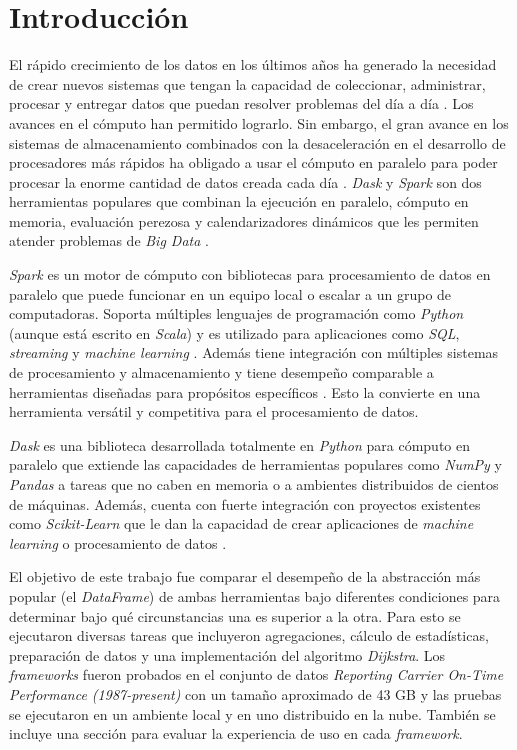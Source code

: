 \chapter*{Introducción}


\noindent El rápido crecimiento de los datos en los últimos años ha generado la necesidad de crear nuevos sistemas que tengan la capacidad de coleccionar, administrar, procesar y entregar datos que puedan resolver problemas del día a día \cite{seagate}. Los avances en el cómputo han permitido lograrlo. Sin embargo, el gran avance en los sistemas de almacenamiento combinados con la desaceleración en el desarrollo de procesadores más rápidos ha obligado a usar el cómputo en paralelo para poder procesar la enorme cantidad de datos creada cada día \cite{sparkguide}. \textit{Dask} y \textit{Spark} son dos herramientas populares que combinan la ejecución en paralelo, cómputo en memoria, evaluación perezosa y calendarizadores dinámicos que les permiten atender problemas de \textit{Big Data} \cite{dask-spark-neuroimaging}.

\textit{Spark} es un motor de cómputo con bibliotecas para procesamiento de datos en paralelo que puede funcionar en un equipo local o escalar a un grupo de computadoras. Soporta múltiples lenguajes de programación como \textit{Python} (aunque está escrito en \textit{Scala}) y es utilizado para aplicaciones como \textit{SQL}, \textit{streaming} y \textit{machine learning} \cite{sparkguide}. Además tiene integración con múltiples sistemas de procesamiento y almacenamiento y tiene desempeño comparable a herramientas diseñadas para propósitos específicos \cite{sparkberkeley}. Esto la convierte en una herramienta versátil y competitiva para el procesamiento de datos. 

\textit{Dask} es una biblioteca desarrollada totalmente en \textit{Python} para cómputo en paralelo que extiende las capacidades de herramientas populares como \textit{NumPy} y \textit{Pandas} a tareas que no caben en memoria o a ambientes distribuidos de cientos de máquinas. Además, cuenta con fuerte integración con proyectos existentes como \textit{Scikit-Learn} que le dan la capacidad de crear aplicaciones de \textit{machine learning} o procesamiento de datos \cite{daskdocs}.

El objetivo de este trabajo fue comparar el desempeño de la abstracción más popular (el \textit{DataFrame}) de ambas herramientas bajo diferentes condiciones para determinar bajo qué circunstancias una es superior a la otra. Para esto se ejecutaron diversas tareas que incluyeron agregaciones, cálculo de estadísticas, preparación de datos y una implementación del algoritmo \textit{Dijkstra}. Los \textit{frameworks} fueron probados en el conjunto de datos \textit{Reporting Carrier On-Time Performance (1987-present)} con un tamaño aproximado de 43 GB y las pruebas se ejecutaron en un ambiente local y en uno distribuido en la nube. También se incluye una sección para evaluar la experiencia de uso en cada \textit{framework}.

